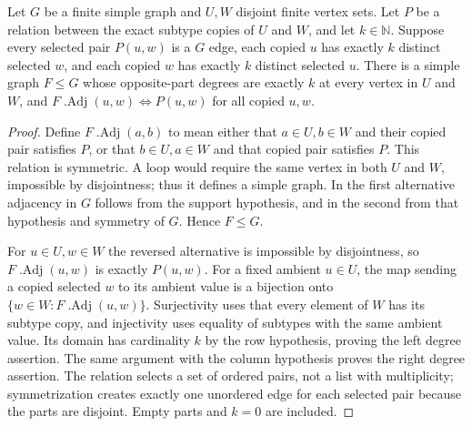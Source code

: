\begin{lemma}
Let $G$ be a finite simple graph and $U,W$ disjoint finite vertex sets.
Let $P$ be a relation between the exact subtype copies of $U$ and $W$,
and let $k\in\mathbb N$. Suppose every selected pair $P(u,w)$ is a
$G$ edge, each copied $u$ has exactly $k$ distinct selected $w$, and
each copied $w$ has exactly $k$ distinct selected $u$.
There is a simple graph $F\leq G$ whose opposite-part degrees are
exactly $k$ at every vertex in $U$ and $W$, and
$F\operatorname{.Adj}(u,w)\iff P(u,w)$ for all copied $u,w$.
\end{lemma}
\begin{proof}
Define $F\operatorname{.Adj}(a,b)$ to mean either that $a\in U,b\in W$
and their copied pair satisfies $P$, or that $b\in U,a\in W$ and that
copied pair satisfies $P$. This relation is symmetric. A loop would
require the same vertex in both $U$ and $W$, impossible by disjointness;
thus it defines a simple graph. In the first alternative adjacency in
$G$ follows from the support hypothesis, and in the second from that
hypothesis and symmetry of $G$. Hence $F\leq G$.

For $u\in U,w\in W$ the reversed alternative is impossible by
disjointness, so $F\operatorname{.Adj}(u,w)$ is exactly $P(u,w)$.
For a fixed ambient $u\in U$, the map sending a copied selected $w$
to its ambient value is a bijection onto
$\{w\in W:F\operatorname{.Adj}(u,w)\}$. Surjectivity uses that every
element of $W$ has its subtype copy, and injectivity uses equality of
subtypes with the same ambient value. Its domain has cardinality $k$
by the row hypothesis, proving the left degree assertion. The same
argument with the column hypothesis proves the right degree assertion.
The relation selects a set of ordered pairs, not a list with multiplicity;
symmetrization creates exactly one unordered edge for each selected
pair because the parts are disjoint. Empty parts and $k=0$ are included.
\end{proof}
